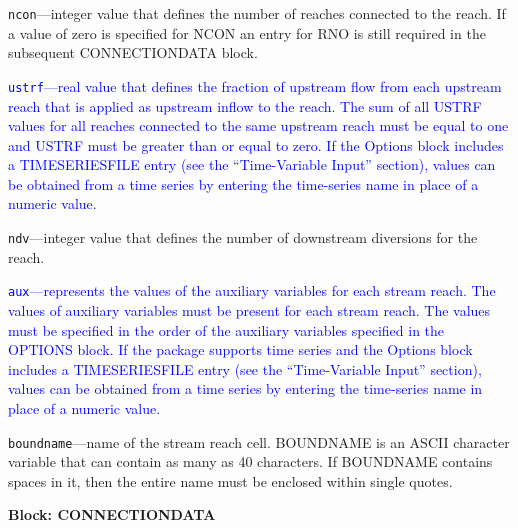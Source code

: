 \begin{description}
\item \texttt{ncon}---integer value that defines the number of reaches connected to the reach.  If a value of zero is specified for NCON an entry for RNO is still required in the subsequent CONNECTIONDATA block.

\item \textcolor{blue}{\texttt{ustrf}---real value that defines the fraction of upstream flow from each upstream reach that is applied as upstream inflow to the reach. The sum of all USTRF values for all reaches connected to the same upstream reach must be equal to one and USTRF must be greater than or equal to zero. If the Options block includes a TIMESERIESFILE entry (see the ``Time-Variable Input'' section), values can be obtained from a time series by entering the time-series name in place of a numeric value.}

\item \texttt{ndv}---integer value that defines the number of downstream diversions for the reach.

\item \textcolor{blue}{\texttt{aux}---represents the values of the auxiliary variables for each stream reach. The values of auxiliary variables must be present for each stream reach. The values must be specified in the order of the auxiliary variables specified in the OPTIONS block.  If the package supports time series and the Options block includes a TIMESERIESFILE entry (see the ``Time-Variable Input'' section), values can be obtained from a time series by entering the time-series name in place of a numeric value.}

\item \texttt{boundname}---name of the stream reach cell.  BOUNDNAME is an ASCII character variable that can contain as many as 40 characters.  If BOUNDNAME contains spaces in it, then the entire name must be enclosed within single quotes.

\end{description}
\item \textbf{Block: CONNECTIONDATA}

